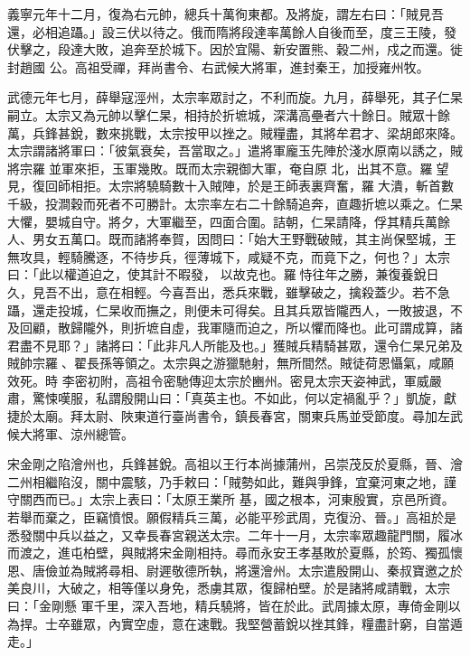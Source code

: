 \begin{pinyinscope}
 義寧元年十二月，復為右元帥，總兵十萬徇東都。及將旋，謂左右曰：「賊見吾還，必相追躡。」設三伏以待之。俄而隋將段達率萬餘人自後而至，度三王陵，發伏擊之，段達大敗，追奔至於城下。因於宜陽、新安置熊、穀二州，戍之而還。徙封趙國
 公。高祖受禪，拜尚書令、右武候大將軍，進封秦王，加授雍州牧。



 武德元年七月，薛舉寇涇州，太宗率眾討之，不利而旋。九月，薛舉死，其子仁杲嗣立。太宗又為元帥以擊仁杲，相持於折墌城，深溝高壘者六十餘日。賊眾十餘萬，兵鋒甚銳，數來挑戰，太宗按甲以挫之。賊糧盡，其將牟君才、梁胡郎來降。太宗謂諸將軍曰：「彼氣衰矣，吾當取之。」遣將軍龐玉先陣於淺水原南以誘之，賊將宗羅並軍來拒，玉軍幾敗。既而太宗親御大軍，奄自原
 北，出其不意。羅望見，復回師相拒。太宗將驍騎數十入賊陣，於是王師表裏齊奮，羅大潰，斬首數千級，投澗穀而死者不可勝計。太宗率左右二十餘騎追奔，直趣折墌以乘之。仁杲大懼，嬰城自守。將夕，大軍繼至，四面合圍。詰朝，仁杲請降，俘其精兵萬餘人、男女五萬口。既而諸將奉賀，因問曰：「始大王野戰破賊，其主尚保堅城，王無攻具，輕騎騰逐，不待步兵，徑薄城下，咸疑不克，而竟下之，何也？」太宗曰：「此以權道迫之，使其計不暇發，
 以故克也。羅恃往年之勝，兼復養銳日久，見吾不出，意在相輕。今喜吾出，悉兵來戰，雖擊破之，擒殺蓋少。若不急躡，還走投城，仁杲收而撫之，則便未可得矣。且其兵眾皆隴西人，一敗披退，不及回顧，散歸隴外，則折墌自虛，我軍隨而迫之，所以懼而降也。此可謂成算，諸君盡不見耶？」諸將曰：「此非凡人所能及也。」獲賊兵精騎甚眾，還令仁杲兄弟及賊帥宗羅、翟長孫等領之。太宗與之游獵馳射，無所間然。賊徒荷恩懾氣，咸願效死。時
 李密初附，高祖令密馳傳迎太宗於豳州。密見太宗天姿神武，軍威嚴肅，驚悚嘆服，私謂殷開山曰：「真英主也。不如此，何以定禍亂乎？」凱旋，獻捷於太廟。拜太尉、陜東道行臺尚書令，鎮長春宮，關東兵馬並受節度。尋加左武候大將軍、涼州總管。



 宋金剛之陷澮州也，兵鋒甚銳。高祖以王行本尚據蒲州，呂崇茂反於夏縣，晉、澮二州相繼陷沒，關中震駭，乃手敕曰：「賊勢如此，難與爭鋒，宜棄河東之地，謹守關西而已。」太宗上表曰：「太原王業所
 基，國之根本，河東殷實，京邑所資。若舉而棄之，臣竊憤恨。願假精兵三萬，必能平殄武周，克復汾、晉。」高祖於是悉發關中兵以益之，又幸長春宮親送太宗。二年十一月，太宗率眾趣龍門關，履冰而渡之，進屯柏壁，與賊將宋金剛相持。尋而永安王孝基敗於夏縣，於筠、獨孤懷恩、唐儉並為賊將尋相、尉遲敬德所執，將還澮州。太宗遣殷開山、秦叔寶邀之於美良川，大破之，相等僅以身免，悉虜其眾，復歸柏壁。於是諸將咸請戰，太宗曰：「金剛懸
 軍千里，深入吾地，精兵驍將，皆在於此。武周據太原，專倚金剛以為捍。士卒雖眾，內實空虛，意在速戰。我堅營蓄銳以挫其鋒，糧盡計窮，自當遁走。」




\end{pinyinscope}
